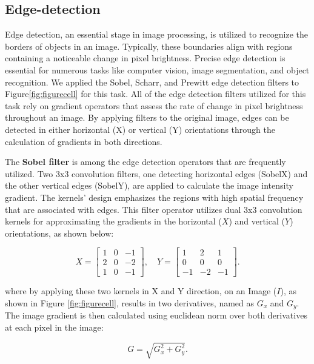 \documentclass[%
	a4paper, %
	12pt, %
	english, %
	bibtotoc %
]{scrartcl}
\begin{document}
\subsection{Edge-detection}
\label{sec:edgedetection}
Edge detection, an essential stage in image processing, is utilized to recognize the borders of objects in an image. Typically, these boundaries align with regions containing a noticeable change in pixel brightness. Precise edge detection is essential for numerous tasks like computer vision, image segmentation, and object recognition. We applied the Sobel, Scharr, and Prewitt edge detection filters to Figure\ref{fig:figurecell} for this task. All of the edge detection filters utilized for this task rely on gradient operators that assess the rate of change in pixel brightness throughout an image. By applying filters to the original image, edges can be detected in either horizontal (X) or vertical (Y) orientations through the calculation of gradients in both directions.

The \textbf{Sobel filter} is among the edge detection operators that are frequently utilized. Two 3x3 convolution filters, one detecting horizontal edges (SobelX) and the other vertical edges (SobelY), are applied to calculate the image intensity gradient. The kernels' design emphasizes the regions with high spatial frequency that are associated with edges. This filter operator utilizes dual 3x3 convolution kernels for approximating the gradients in the horizontal (\(X\)) and vertical (\(Y\)) orientations, as shown below:

\begin{equation}
X = 
\begin{bmatrix}
1 & 0 & -1 \\
2 & 0 & -2 \\
1 & 0 & -1
\end{bmatrix},
\quad
Y = 
\begin{bmatrix}
1 & 2 & 1 \\
0 & 0 & 0 \\
-1 & -2 & -1
\end{bmatrix}.
\end{equation}

where by applying these two kernels in X and Y direction, on an Image (\(I\)), as shown in Figure \ref{fig:figurecell}, results in two derivatives, named as \(G_x\) and \(G_y\). The image gradient is then calculated using euclidean norm over both derivatives at each pixel in the image:

\begin{equation}
G = \sqrt{G_x^2 + G_y^2}.
\label{eq:img_gradient}
\end{equation}   
\end{document}

